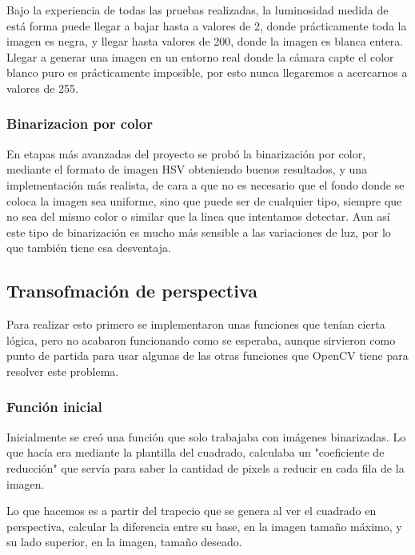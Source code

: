 Bajo la experiencia de todas las pruebas realizadas, la luminosidad medida de está forma puede llegar a bajar hasta a valores de 2, donde prácticamente toda la imagen es negra, y llegar hasta valores de 200, donde la imagen es blanca entera. Llegar a generar una imagen en un entorno real donde la cámara capte el color blanco puro es prácticamente imposible, por esto nunca llegaremos a acercarnos a valores de 255. 

\subsubsection{Binarizacion por color}

En etapas más avanzadas del proyecto se probó la binarización por color, mediante el formato de imagen HSV obteniendo buenos resultados, y una implementación más realista, de cara a que no es necesario que el fondo donde se coloca la imagen sea uniforme, sino que puede ser de cualquier tipo, siempre que no sea del mismo color o similar que la linea que intentamos detectar. Aun así este tipo de binarización es mucho más sensible a las variaciones de luz, por lo que también tiene esa desventaja.

\subsection{Transofmación de perspectiva}
Para realizar esto primero se implementaron unas funciones que tenían cierta lógica, pero no acabaron funcionando como se esperaba, aunque sirvieron como punto de partida para usar algunas de las otras funciones que OpenCV tiene para resolver este problema.

\subsubsection{Función inicial}

Inicialmente se creó una función que solo trabajaba con imágenes binarizadas. Lo que hacía era mediante la plantilla del cuadrado, calculaba un "coeficiente de reducción" que servía para saber la cantidad de pixels a reducir en cada fila de la imagen. 

Lo que hacemos es a partir del trapecio que se genera al ver el cuadrado en perspectiva, calcular la diferencia entre su base, en la imagen tamaño máximo, y su lado superior, en la imagen, tamaño deseado. 


